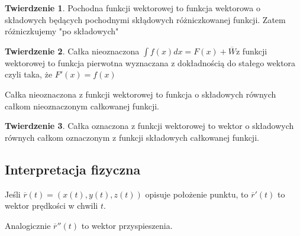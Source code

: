 \documentclass{article}
\theoremstyle{definition}
\theoremstyle{definition}
\newtheorem{tw}{Twierdzenie}[subsection]
\theoremstyle{definition}
\begin{document}
\begin{tw}
Pochodna funkcji wektorowej to funkcja wektorowa o składowych będących
pochodnymi skłądowych różniczkowanej funkcji. Zatem różniczkujemy
"po składowych"
\end{tw}

\begin{tw}
Całka nieoznaczona $ \int f(x)dx = F(x) + \overline{W}$z funkcji wektorowej
to funkcja pierwotna wyznaczana z dokładnością do stałego wektora czyli taka,
że $F'(x) = f(x)$

Całka nieoznaczona z funkcji wektorowej to funkcja o składowych równych całkom
nieoznaczonym całkowanej funkcji.
\end{tw}

\begin{tw}
Całka oznaczona z funkcji wektorowej to wektor o składowych równych
całkom oznaczonym z funkcji składowych całkowanej funkcji.
\end{tw}

\subsection{Interpretacja fizyczna}

Jeśli $\overline{r}(t) = (x(t), y(t), z(t))$ opisuje położenie punktu, to
$\overline{r}'(t) $ to wektor prędkości w chwili $t$.

Analogicznie $\overline{r}''(t)$ to wektor przyspieszenia.



\newpage

\end{document}
